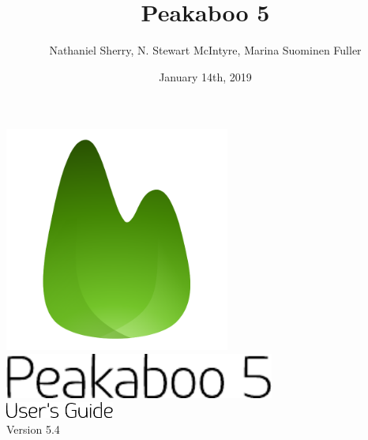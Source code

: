 \documentclass[article,twoside,11pt]{report}
\title{Peakaboo 5}
\date{January 14th, 2019}
\author{Nathaniel Sherry, N. Stewart McIntyre, Marina Suominen Fuller}
\begin{document}
\renewcommand{\headrulewidth}{0pt}
\lhead[]{}
\rhead[]{}


\pagestyle{empty}



\begin{titlepage}
	\vspace*{\fill}
	\centering
	\includegraphics[height=20em]{title/logo.pdf}\\
	\vspace*{1em}
	\includegraphics[height=4em]{title/peakaboo.pdf}\\
	\vspace*{1em}
	\includegraphics[height=1.5em]{title/usersguide.pdf}\\
	\vspace*{\fill}
	\vspace*{\fill}
	Version 5.4
\end{titlepage}

\cleardoublepage

\pagestyle{empty}
\setcounter{tocdepth}{1}
\tableofcontents
{}
\cleardoublepage
\setcounter{page}{1}
\pagestyle{fancyplain}
\end{document}

